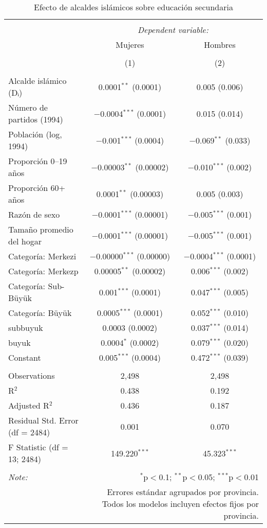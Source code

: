 
\begin{table}[ht!] \centering 
  \caption{Efecto de alcaldes islámicos sobre educación secundaria} 
  \label{tab:rd_controles_mujeres_hombres} 
\begin{tabular}{@{\extracolsep{5pt}}lcc} 
\\[-1.8ex]\hline 
\hline \\[-1.8ex] 
 & \multicolumn{2}{c}{\textit{Dependent variable:}} \\ 
\cline{2-3} 
 & Mujeres & Hombres \\ 
\\[-1.8ex] & (1) & (2)\\ 
\hline \\[-1.8ex] 
 Alcalde islámico (Dᵢ) & 0.0001$^{**}$ (0.0001) & 0.005 (0.006) \\ 
  Número de partidos (1994) & $-$0.0004$^{***}$ (0.0001) & 0.015 (0.014) \\ 
  Población (log, 1994) & $-$0.001$^{***}$ (0.0004) & $-$0.069$^{**}$ (0.033) \\ 
  Proporción 0–19 años & $-$0.00003$^{**}$ (0.00002) & $-$0.010$^{***}$ (0.002) \\ 
  Proporción 60+ años & 0.0001$^{**}$ (0.00003) & 0.005 (0.003) \\ 
  Razón de sexo & $-$0.0001$^{***}$ (0.00001) & $-$0.005$^{***}$ (0.001) \\ 
  Tamaño promedio del hogar & $-$0.0001$^{***}$ (0.00001) & $-$0.005$^{***}$ (0.001) \\ 
  Categoría: Merkezi & $-$0.00000$^{***}$ (0.00000) & $-$0.0004$^{***}$ (0.0001) \\ 
  Categoría: Merkezp & 0.00005$^{**}$ (0.00002) & 0.006$^{***}$ (0.002) \\ 
  Categoría: Sub-Büyük & 0.001$^{***}$ (0.0001) & 0.047$^{***}$ (0.005) \\ 
  Categoría: Büyük & 0.0005$^{***}$ (0.0001) & 0.052$^{***}$ (0.010) \\ 
  subbuyuk & 0.0003 (0.0002) & 0.037$^{***}$ (0.014) \\ 
  buyuk & 0.0004$^{*}$ (0.0002) & 0.079$^{***}$ (0.020) \\ 
  Constant & 0.005$^{***}$ (0.0004) & 0.472$^{***}$ (0.039) \\ 
 \hline \\[-1.8ex] 
Observations & 2,498 & 2,498 \\ 
R$^{2}$ & 0.438 & 0.192 \\ 
Adjusted R$^{2}$ & 0.436 & 0.187 \\ 
Residual Std. Error (df = 2484) & 0.001 & 0.070 \\ 
F Statistic (df = 13; 2484) & 149.220$^{***}$ & 45.323$^{***}$ \\ 
\hline 
\hline \\[-1.8ex] 
\textit{Note:}  & \multicolumn{2}{r}{$^{*}$p$<$0.1; $^{**}$p$<$0.05; $^{***}$p$<$0.01} \\ 
 & \multicolumn{2}{r}{Errores estándar agrupados por provincia. Todos los modelos incluyen efectos fijos por provincia.} \\ 
\end{tabular} 
\end{table} 

